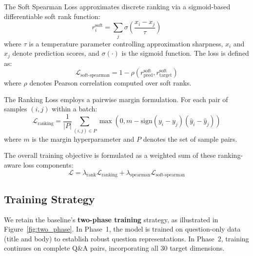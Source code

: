 \documentclass{article}
\begin{document}
The Soft Spearman Loss approximates discrete ranking via a sigmoid-based differentiable soft rank function:
\begin{equation}
    r_i^{\text{soft}} = \sum_{j} \sigma\left(\frac{x_i - x_j}{\tau}\right)
\end{equation}
where $\tau$ is a temperature parameter controlling approximation sharpness, $x_i$ and $x_j$ denote prediction scores, and $\sigma(\cdot)$ is the sigmoid function. The loss is defined as:
\begin{equation}
    \mathcal{L}_{\text{soft-spearman}} = 1 - \rho(r^{\text{soft}}_{\text{pred}}, r^{\text{soft}}_{\text{target}})
\end{equation}
where $\rho$ denotes Pearson correlation computed over soft ranks.

The Ranking Loss employs a pairwise margin formulation. For each pair of samples $(i, j)$ within a batch:
\begin{equation}
    \mathcal{L}_{\text{ranking}} = \frac{1}{|P|}\sum_{(i,j) \in P} \max\left(0, m - \text{sign}(y_i - y_j)(\hat{y}_i - \hat{y}_j)\right)
\end{equation}
where $m$ is the margin hyperparameter and $P$ denotes the set of sample pairs.

The overall training objective is formulated as a weighted sum of these ranking-aware loss components:
\begin{equation}
    \mathcal{L} = \lambda_{\text{rank}} \mathcal{L}_{\text{ranking}} + \lambda_{\text{spearman}} \mathcal{L}_{\text{soft-spearman}}
\end{equation}


\subsection{Training Strategy}
We retain the baseline's \textbf{two-phase training} strategy, as illustrated in Figure~\ref{fig:two_phase}. In Phase~1, the model is trained on question-only data (title and body) to establish robust question representations. In Phase~2, training continues on complete Q\&A pairs, incorporating all 30 target dimensions.
\end{document}
